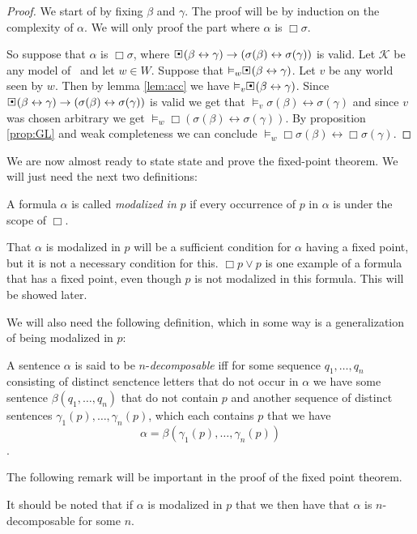 \documentclass[../main.tex]{subfiles}
\begin{document}
\begin{proof}
	We start of by fixing $\beta$ and $\gamma$. The proof will be by
	induction on the complexity of $\alpha$. We will only proof the part
	where $\alpha$ is $\Box\sigma$.

	So suppose that $\alpha$ is $\Box\sigma$, where
	$\sBox(\beta\leftrightarrow\gamma)\rightarrow(\sigma(\beta)\leftrightarrow\sigma(\gamma))$
	is valid. Let $\mathcal{K}$ be any model of \GL\ and let $w\in W$.
	Suppose that $\vDash_w\sBox(\beta\leftrightarrow\gamma)$. Let $v$ be
	any world seen by $w$. Then by lemma \ref{lem:acc} we have
	$\vDash_v\sBox(\beta\leftrightarrow\gamma)$. Since 
	$\sBox(\beta\leftrightarrow\gamma)\rightarrow(\sigma(\beta)\leftrightarrow\sigma(\gamma))$
	is valid we get that
	$\vDash_v\sigma(\beta)\leftrightarrow\sigma(\gamma)$ and since
	$v$ was chosen arbitrary we get
	$\vDash_w\Box(\sigma(\beta)\leftrightarrow\sigma(\gamma))$. By
	proposition \ref{prop:GL} and weak completeness we can conclude
	$\vDash_w\Box\sigma(\beta)\leftrightarrow\Box\sigma(\gamma)$.
\end{proof}

We are now almost ready to state state and prove the fixed-point theorem. We
will just need the next two definitions:
\begin{defi}
	A formula $\alpha$ is called \textit{modalized in} $p$ if every occurrence of
	$p$ in  $\alpha$ is under the scope of $\Box$.
\end{defi}
That  $\alpha$ is modalized in $p$ will be a sufficient  condition for $\alpha$
having a fixed point, but it is not a necessary condition for this. $\Box p\vee
p$ is one example of a formula that has a fixed point, even though $p$ is not
modalized in this formula.  This will be showed later.

We will also need the following definition, which in some way is a
generalization of being modalized in $p$:
\begin{defi}
	A sentence $\alpha$ is said to be $n$-\textit{decomposable} iff for some
	sequence $q_1,\ldots,q_n$ consisting of distinct senctence letters that
	do not occur in $\alpha$ we have some sentence $\beta(q_1,\ldots,q_n)$
	that do not contain $p$ and another sequence of distinct sentences 
	$\gamma_1(p),\ldots,\gamma_n(p)$, which each contains $p$ that we have
	$$\alpha=\beta(\gamma_1(p),\ldots,\gamma_n(p))$$.
\end{defi}
The following remark will be important in the proof of the fixed point theorem.
\begin{remark}
It should be noted that if $\alpha$ is modalized in $p$ that we then have that
$\alpha$ is $n$-decomposable for some $n$.
\end{remark}
\end{document}
